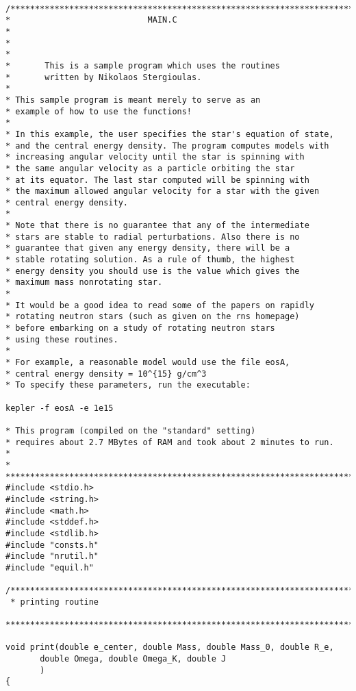 \begin{verbatim}

/************************************************************************** 
*                            MAIN.C                                       * 
*                                                                         *
*       This is a sample program which uses the routines 
*       written by Nikolaos Stergioulas. 
*
* This sample program is meant merely to serve as an 
* example of how to use the functions! 
*
* In this example, the user specifies the star's equation of state,
* and the central energy density. The program computes models with
* increasing angular velocity until the star is spinning with 
* the same angular velocity as a particle orbiting the star
* at its equator. The last star computed will be spinning with
* the maximum allowed angular velocity for a star with the given
* central energy density. 
*
* Note that there is no guarantee that any of the intermediate
* stars are stable to radial perturbations. Also there is no
* guarantee that given any energy density, there will be a 
* stable rotating solution. As a rule of thumb, the highest 
* energy density you should use is the value which gives the
* maximum mass nonrotating star. 
*
* It would be a good idea to read some of the papers on rapidly
* rotating neutron stars (such as given on the rns homepage)
* before embarking on a study of rotating neutron stars
* using these routines. 
* 
* For example, a reasonable model would use the file eosA,
* central energy density = 10^{15} g/cm^3 
* To specify these parameters, run the executable:
 
kepler -f eosA -e 1e15 

* This program (compiled on the "standard" setting) 
* requires about 2.7 MBytes of RAM and took about 2 minutes to run.
*                                                                         *
**************************************************************************/
#include <stdio.h>
#include <string.h> 
#include <math.h>
#include <stddef.h>
#include <stdlib.h>
#include "consts.h"
#include "nrutil.h"
#include "equil.h"

/***************************************************************************
 * printing routine  
 ***************************************************************************/
									    
void print(double e_center, double Mass, double Mass_0, double R_e,
	   double Omega, double Omega_K, double J
	   )
{


\end{verbatim}

